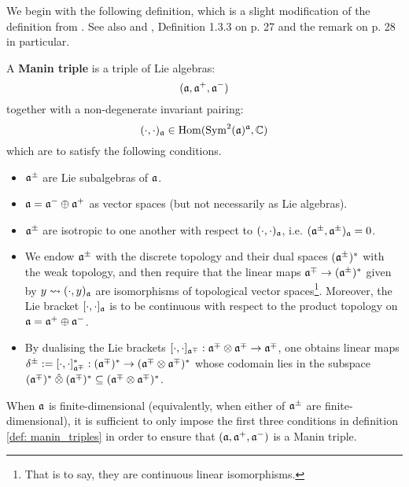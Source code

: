 We begin with the following definition, which is a slight modification of the definition from \cite[Subsection 2.6]{appel_laredo_2_categorical_etingof_kazhdan_quantisation}. See also \cite[Subsection 7.4]{etingof_kazhdan_quantisation_1} and \cite[Subsection 1.3.B]{chari_pressley_quantum_groups}, Definition 1.3.3 on p. 27 and the remark on p. 28 in particular.
\begin{definition} \label{def: manin_triples}
    A \textbf{Manin triple} is a triple of Lie algebras:
        $$(\mathfrak{a}, \mathfrak{a}^+, \mathfrak{a}^-)$$
    together with a non-degenerate invariant pairing:
        $$(\cdot, \cdot)_{\mathfrak{a}} \in \operatorname{Hom}( \operatorname{Sym}^2(\mathfrak{a})^{\mathfrak{a}}, \mathbb{C} )$$
    which are to satisfy the following conditions.
    \begin{itemize}
        \item $\mathfrak{a}^{\pm}$ are Lie subalgebras of $\mathfrak{a}$.
        \item $\mathfrak{a} = \mathfrak{a}^- \oplus \mathfrak{a}^+$ as vector spaces (but not necessarily as Lie algebras).
        \item $\mathfrak{a}^{\pm}$ are isotropic to one another with respect to $(\cdot, \cdot)_{\mathfrak{a}}$, i.e. $(\mathfrak{a}^{\pm}, \mathfrak{a}^{\pm})_{\mathfrak{a}} = 0$.
        \item We endow $\mathfrak{a}^{\pm}$ with the discrete topology and their dual spaces $(\mathfrak{a}^{\pm})^*$ with the weak topology, and then require that the linear maps $\mathfrak{a}^{\mp} \to (\mathfrak{a}^{\pm})^*$ given by $y \leadsto (\cdot, y)_{\mathfrak{a}}$ are isomorphisms of topological vector spaces\footnote{That is to say, they are continuous linear isomorphisms.}. Moreover, the Lie bracket $[\cdot, \cdot]_{\mathfrak{a}}$ is to be continuous with respect to the product topology on $\mathfrak{a} = \mathfrak{a}^+ \oplus \mathfrak{a}^-$.
        \item By dualising the Lie brackets $[\cdot, \cdot]_{\a^{\mp}}: \a^{\mp} \tensor \a^{\mp} \to \a^{\mp}$, one obtains linear maps $\delta^{\pm} := [\cdot, \cdot]_{\a^{\mp}}^*: (\a^{\mp})^* \to (\a^{\mp} \tensor \a^{\mp})^*$ whose codomain lies in the subspace $(\a^{\mp})^* \hattensor (\a^{\mp})^* \subseteq (\a^{\mp} \tensor \a^{\mp})^*$.
    \end{itemize}
\end{definition}
\begin{remark}
    When $\mathfrak{a}$ is finite-dimensional (equivalently, when either of $\mathfrak{a}^{\pm}$ are finite-dimensional), it is sufficient to only impose the first three conditions in definition \ref{def: manin_triples} in order to ensure that $(\mathfrak{a}, \mathfrak{a}^+, \mathfrak{a}^-)$ is a Manin triple.
\end{remark}

